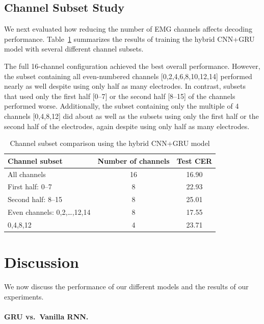 \documentclass{article}
\begin{document}
\subsection{Channel Subset Study}

We next evaluated how reducing the number of EMG channels affects decoding performance.
Table~\ref{tab:channel-subset-comparison} summarizes the results of training the hybrid
CNN+GRU model with several different channel subsets.

The full 16-channel configuration achieved the best overall performance. However, the
subset containing all even-numbered channels [0,2,4,6,8,10,12,14] performed nearly as
well despite using only half as many electrodes. In contrast, subsets that used only
the first half [0--7] or the second half [8--15] of the channels performed worse.
Additionally, the subset containing only the multiple of 4 channels [0,4,8,12] did
about as well as the subsets using only the first half or the second half of the
electrodes, again despite using only half as many electrodes.

\begin{table}[t]
	\caption{Channel subset comparison using the hybrid CNN+GRU model}
	\label{tab:channel-subset-comparison}
	\centering
	\begin{tabular}{lcc}
		\toprule
		Channel subset                  & Number of channels & Test CER \\
		\midrule
		All channels                    & 16                 & 16.90    \\
		First half: 0--7                & 8                  & 22.93    \\
		Second half: 8--15              & 8                  & 25.01    \\
		Even channels: 0,2,\ldots,12,14 & 8                  & 17.55    \\
		0,4,8,12                        & 4                  & 23.71    \\
		\bottomrule
	\end{tabular}
\end{table}

\section{Discussion}

We now discuss the performance of our different models and the results of our experiments.

\paragraph{GRU vs.\ Vanilla RNN.}
\end{document}
